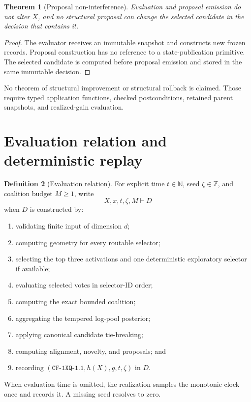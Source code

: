 \documentclass[11pt]{article}
\theoremstyle{definition}
\newtheorem{definition}{Definition}[section]
\theoremstyle{plain}
\newtheorem{theorem}[definition]{Theorem}
\newcommand{\N}{\mathbb{N}}
\newcommand{\modelid}{\texttt{CF-1XQ-1.1}}
\begin{document}
\begin{theorem}[Proposal non-interference]
\label{thm:proposal}
Evaluation and proposal emission do not alter $X$, and no structural proposal
can change the selected candidate in the decision that contains it.
\end{theorem}

\begin{proof}
The evaluator receives an immutable snapshot and constructs new frozen
records.  Proposal construction has no reference to a state-publication
primitive.  The selected candidate is computed before proposal emission and
stored in the same immutable decision.
\end{proof}

No theorem of structural improvement or structural rollback is claimed.
Those require typed application functions, checked postconditions, retained
parent snapshots, and realized-gain evaluation.

\section{Evaluation relation and deterministic replay}

\begin{definition}[Evaluation relation]
For explicit time $t\in\N$, seed $\zeta\in\mathbb Z$, and coalition budget
$M\ge1$, write
\[
X,x,t,\zeta,M\vdash D
\]
when $D$ is constructed by:
\begin{enumerate}[leftmargin=*,itemsep=1pt]
  \item validating finite input of dimension $d$;
  \item computing geometry for every routable selector;
  \item selecting the top three activations and one deterministic exploratory
  selector if available;
  \item evaluating selected votes in selector-ID order;
  \item computing the exact bounded coalition;
  \item aggregating the tempered log-pool posterior;
  \item applying canonical candidate tie-breaking;
  \item computing alignment, novelty, and proposals; and
  \item recording $(\modelid,h(X),g,t,\zeta)$ in $D$.
\end{enumerate}
\end{definition}

When evaluation time is omitted, the realization samples the monotonic clock
once and records it.  A missing seed resolves to zero.
\end{document}
